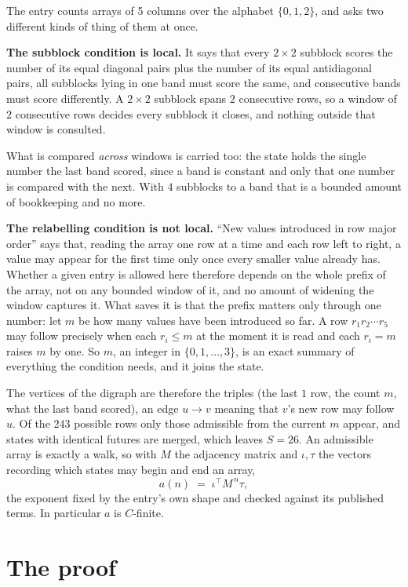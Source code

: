 \documentclass[11pt,a4paper]{article}
\theoremstyle{plain}
\theoremstyle{definition}
\begin{document}
The entry counts arrays of 5 columns over the alphabet $\{0,1,2\}$, and asks two different kinds of thing of them at once.

\textbf{The subblock condition is local.} It says that every $2\times2$ subblock scores the number of its equal diagonal pairs plus the number of its equal antidiagonal pairs, all subblocks lying in one band must score the same, and consecutive bands must score differently. A $ 2\times2$ subblock spans $2$ consecutive rows, so a window of $2$ consecutive rows decides every subblock it closes, and nothing outside that window is consulted.

What is compared \emph{across} windows is carried too: the state holds the single number the last band scored, since a band is constant and only that one number is compared with the next. With $4$ subblocks to a band that is a bounded amount of bookkeeping and no more.

\textbf{The relabelling condition is not local.} ``New values introduced in row major order'' says that, reading the array one row at a time and each row left to right, a value may appear for the first time only once every smaller value already has. Whether a given entry is allowed here therefore depends on the whole prefix of the array, not on any bounded window of it, and no amount of widening the window captures it. What saves it is that the prefix matters only through one number: let $m$ be how many values have been introduced so far. A row $r_1r_2\cdots r_5$ may follow precisely when each $r_i\le m$ at the moment it is read and each $r_i=m$ raises $m$ by one. So $m$, an integer in $\{0,1,\dots,3\}$, is an exact summary of everything the condition needs, and it joins the state.

The vertices of the digraph are therefore the triples (the last $1$ row, the count $m$, what the last band scored), an edge $u\to v$ meaning that $v$'s new row may follow $u$. Of the $243$ possible rows only those admissible from the current $m$ appear, and states with identical futures are merged, which leaves $S=26$. An admissible array is exactly a walk, so with $M$ the adjacency matrix and $\iota,\tau$ the vectors recording which states may begin and end an array,
\[
a(n)\;=\;\iota^{\!\top}M^{\,n}\tau ,
\]
the exponent fixed by the entry's own shape and checked against its published terms. In
particular $a$ is $C$-finite.

\section{The proof}
\end{document}
